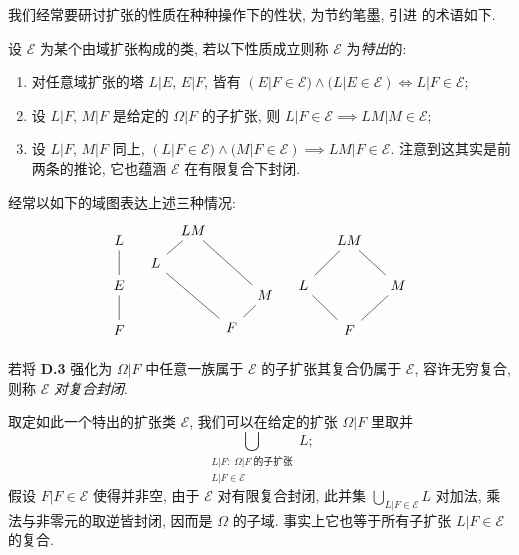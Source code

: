 我们经常要研讨扩张的性质在种种操作下的性状, 为节约笔墨, 引进 \cite[V. \S 1]{Lang02} 的术语如下.
\begin{convention}\label{con:dist-extensions}
	设 $\mathcal{E}$ 为某个由域扩张构成的类, 若以下性质成立则称 $\mathcal{E}$ 为\emph{特出}的:
	\begin{enumerate}[\bfseries {D}.1]
		\item 对任意域扩张的塔 $L|E$, $E|F$, 皆有 $(E|F \in \mathcal{E}) \wedge (L|E \in \mathcal{E}) \iff L|F \in \mathcal{E}$;
		\item 设 $L|F$, $M|F$ 是给定的 $\Omega|F$ 的子扩张, 则 $L|F \in \mathcal{E} \implies LM|M \in \mathcal{E}$;
		\item 设 $L|F$, $M|F$ 同上, $(L|F \in \mathcal{E}) \wedge (M|F \in \mathcal{E}) \implies LM|F \in \mathcal{E}$. 注意到这其实是前两条的推论, 它也蕴涵 $\mathcal{E}$ 在有限复合下封闭.
	\end{enumerate}
	经常以如下的域图表达上述三种情况:
	\[ \begin{tikzcd}
		L \arrow[dash,d] \\ E \arrow[dash,d] \\ F
	\end{tikzcd} \quad \begin{tikzcd}[row sep=small, column sep=tiny]
		& LM \arrow[dash,ld] \arrow[dash,rrdd] & & \\
		L \arrow[dash,rrdd] & & & \\
		& & & M \arrow[dash,ld] \\
		& & F &\\
	\end{tikzcd} \quad \begin{tikzcd}[column sep=small]
		& LM \arrow[dash,ld] \arrow[dash,rd] & \\
		L \arrow[dash,rd] & & M \arrow[dash,ld] \\
		& F &
	\end{tikzcd}\]
	若将 \textbf{D.3} 强化为 $\Omega|F$ 中任意一族属于 $\mathcal{E}$ 的子扩张其复合仍属于 $\mathcal{E}$, 容许无穷复合, 则称 $\mathcal{E}$ \emph{对复合封闭}.
\end{convention}

取定如此一个特出的扩张类 $\mathcal{E}$, 我们可以在给定的扩张 $\Omega|F$ 里取并
\[ \bigcup_{\substack{L|F: \; \Omega|F \;\text{的子扩张} \\ L|F \in \mathcal{E}}} L; \]
假设 $F|F \in \mathcal{E}$ 使得并非空, 由于 $\mathcal{E}$ 对有限复合封闭, 此并集 $\bigcup_{L|F \in \mathcal{E}} L$ 对加法, 乘法与非零元的取逆皆封闭, 因而是 $\Omega$ 的子域. 事实上它也等于所有子扩张 $L|F \in \mathcal{E}$ 的复合.

